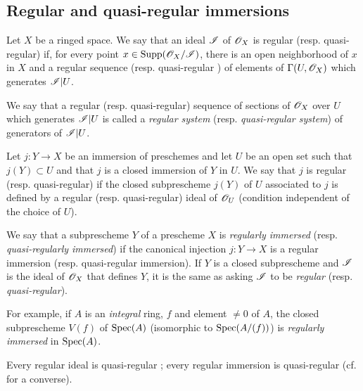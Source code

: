\subsection{Regular and quasi-regular immersions}
\label{IV.16.9}

\begin{definition}[16.9.1]
\label{IV.16.9.1}
Let $X$ be a ringed space.
We say that an ideal $\mathscr{I}$ of $\mathscr{O}_X$ is regular (resp. quasi-regular) if, for every point $x \in \operatorname{Supp}(\mathscr{O}_X/\mathscr{I})$, there is an open neighborhood of $x$ in $X$ and a regular sequence  (resp. quasi-regular ) of elements of $\Gamma(U, \mathscr{O}_X)$ which generates $\mathscr{I}|U$. 
\end{definition}

We say that a regular (resp. quasi-regular) sequence of sections of $\mathscr{O}_X$ over $U$ which generates $\mathscr{I}|U$ is called a \emph{regular system} (resp. \emph{quasi-regular system}) of generators of $\mathscr{I}|U$.

\begin{definition}[16.9.2]
\label{IV.16.9.2}
Let $j: Y \to X$ be an immersion of preschemes and let $U$ be an open set such that $j(Y) \subset U$ and that $j$ is a closed immersion of $Y$ in $U$.
We say that $j$ is regular (resp. quasi-regular) if the closed subprescheme $j(Y)$ of $U$ associated to $j$ is defined by a regular (resp. quasi-regular) ideal of $\mathscr{O}_U$ (condition independent of the choice of $U$).
\end{definition}

We say that a subprescheme $Y$ of a prescheme $X$ is \emph{regularly immersed} (resp. \emph{quasi-regularly immersed}) if the canonical injection $j:Y \to X$ is a regular immersion (resp. quasi-regular immersion). 
If $Y$ is a closed subprescheme and $\mathscr{I}$ is the ideal of $\mathscr{O}_X$ that defines $Y$, it is the same as asking $\mathscr{I}$ to be \emph{regular} (resp. \emph{quasi-regular}).

For example, if $A$ is an \emph{integral} ring, $f$ and element $\neq 0$ of $A$, the closed subprescheme $V(f)$ of $\operatorname{Spec}(A)$ (isomorphic to $\operatorname{Spec}(A/(f))$) is \emph{regularly immersed} in $\operatorname{Spec}(A)$.

Every regular ideal is quasi-regular ;
every regular immersion is quasi-regular (cf.  for a converse).  

